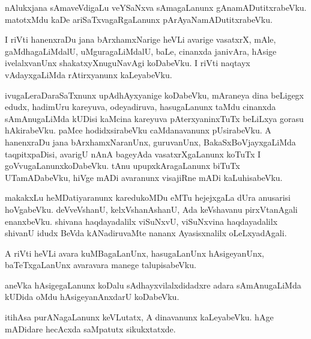 \documentclass{article}
\begin{document}
\begin{mn}
nAlukxjana  sAmaveVdigaLu  veYSaNxva  sAmagaLanunx  gAnamADutitxrabeVku.  matotxMdu  kaDe  
ariSaTxvagaRgaLanunx  pArAyaNamADutitxrabeVku.
\end{mn}

\begin{mn}
I riVti  hanenxraDu  jana  bArxhamxNarige  heVLi  avarige  vasatxrX,  mAle,  gaMdhagaLiMdalU,  
uMguragaLiMdalU,  baLe,  cinanxda  janivAra,  hAsige  ivelalxvanUnx  shakatxyXnuguNavAgi  
koDabeVku.  I riVti  naqtayx  vAdayxgaLiMda  rAtirxyanunx  kaLeyabeVku.
\end{mn}

\begin{mn}
ivugaLeraDaraSaTxnunx  upAdhAyxyanige  koDabeVku,  mAraneya  dina  beLigegx  edudx,  hadimUru  
kareyuva,  odeyadiruva,  hasugaLanunx  taMdu  cinanxda  sAmAnugaLiMda  kUDisi  kaMcina  kareyuva  
pAterxyaninxTuTx  beLiLxya  gorasu  hAkirabeVku.  paMce  hodidxsirabeVku  caMdanavanunx  pUsirabeVku.  
A  hanenxraDu  jana  bArxhamxNaranUnx,  guruvanUnx,  BakaSxBoVjayxgaLiMda  taqpitxpaDisi,  avarigU  
nAnA bageyAda  vasatxrXgaLanunx  koTuTx  I  goVvugaLanunxkoDabeVku.  tAnu  upupxkAragaLanunx  biTuTx  
UTamADabeVku,  hiVge  mADi  avaranunx  visajiRne  mADi  kaLuhisabeVku.  
\end{mn}

\begin{mn}
makakxLu  heMDatiyaranunx  karedukoMDu  eMTu  hejejxgaLa  dUra   anusarisi  hoVgabeVku.  
deVveVshanU,  kelxVshanAshanU,  Ada  keVshavanu  pirxVtanAgali  enanxbeVku.  shivana  
haqdayadalilx  viSuNxvU,  viSuNxvina  haqdayadalilx  shivanU  idudx  BeVda kANadiruvaMte  
nananx  Ayasisxnalilx  oLeLxyadAgali.
\end{mn}

\begin{mn}
A riVti  heVLi  avara  kuMBagaLanUnx,  hasugaLanUnx  hAsigeyanUnx,  baTeTxgaLanUnx  
avaravara  manege  talupisabeVku.
\end{mn}

\begin{mn}
aneVka  hAsigegaLanunx  koDalu  sAdhayxvilalxdidadxre  adara  sAmAnugaLiMda  kUDida  oMdu  
hAsigeyanAnxdarU  koDabeVku.
\end{mn}

\begin{mn}
itihAsa  purANagaLanunx  keVLutatx,  A  dinavanunx  kaLeyabeVku.  hAge  mADidare  hecAcxda  
saMpatutx  sikukxtatxde. 
\end{mn}
\end{document}
